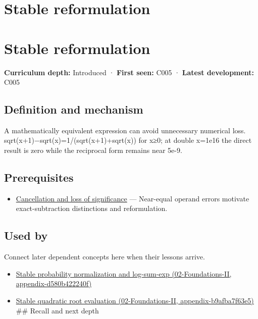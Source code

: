 \hypertarget{appendix-d7f8ba961670}{}
\section*{Stable reformulation}
\section{Stable reformulation}\label{appendix-d7f8ba961670-stable-reformulation}

\textbf{Curriculum depth:} Introduced · \textbf{First seen:} C005 · \textbf{Latest development:} C005

\subsection{Definition and mechanism}\label{appendix-d7f8ba961670-definition-and-mechanism}

A mathematically equivalent expression can avoid unnecessary numerical loss. sqrt(x+1)−sqrt(x)=1/(sqrt(x+1)+sqrt(x)) for x≥0; at double x=1e16 the direct result is zero while the reciprocal form remains near 5e-9.

\subsection{Prerequisites}\label{appendix-d7f8ba961670-prerequisites}

\begin{itemize}
\tightlist
\item
  \hyperref[appendix-a2773a6a2f9d]{Cancellation and loss of significance} --- Near-equal operand errors motivate exact-subtraction distinctions and reformulation.
\end{itemize}

\subsection{Used by}\label{appendix-d7f8ba961670-used-by}

Connect later dependent concepts here when their lessons arrive.

\begin{itemize}
\tightlist
\item
  \href{../02-Foundations-II/main.pdf\#nameddest=appendix-d580b422240f}{Stable probability normalization and log-sum-exp (02-Foundations-II, appendix-d580b422240f)}
\item
  \href{../02-Foundations-II/main.pdf\#nameddest=appendix-b9afba7f63e5}{Stable quadratic root evaluation (02-Foundations-II, appendix-b9afba7f63e5)} \#\# Recall and next depth
\end{itemize}

